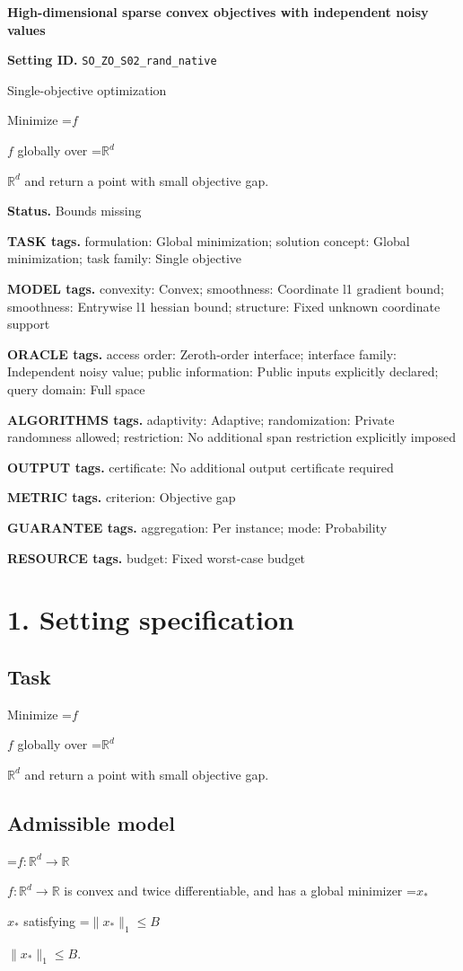 \documentclass[10pt,a4paper]{article}
\newcommand{\AtlasMath}[1]{\par\begingroup\centering\setbox0=\hbox{$\displaystyle #1$}\ifdim\wd0>1.4\linewidth\typeout{ATLAS WIDE FORMULA: \the\wd0}\fi\ifdim\wd0>\linewidth\resizebox{\linewidth}{!}{\box0}\else\box0\fi\par\endgroup}
\newcommand{\AtlasInlineMath}[1]{\begingroup\setbox0=\hbox{$#1$}\ifdim\wd0>.4\linewidth\endgroup\AtlasMath{#1}\else\endgroup$#1$\fi}
\begin{document}
\raggedright

{\LARGE\bfseries\sffamily\color{AtlasNavy} High-dimensional sparse convex objectives with independent noisy values\par}\vspace{5pt}
\textbf{Setting ID.} \texttt{SO\_\allowbreak{}ZO\_\allowbreak{}S02\_\allowbreak{}rand\_\allowbreak{}native}

Single-objective optimization

Minimize \AtlasInlineMath{f} globally over \AtlasInlineMath{\mathbb{R}^d} and return a point with small objective gap.

\textbf{Status.} Bounds missing

\textbf{TASK tags.} formulation: Global minimization; solution concept: Global minimization; task family: Single objective

\textbf{MODEL tags.} convexity: Convex; smoothness: Coordinate l1 gradient bound; smoothness: Entrywise l1 hessian bound; structure: Fixed unknown coordinate support

\textbf{ORACLE tags.} access order: Zeroth-order interface; interface family: Independent noisy value; public information: Public inputs explicitly declared; query domain: Full space

\textbf{ALGORITHMS tags.} adaptivity: Adaptive; randomization: Private randomness allowed; restriction: No additional span restriction explicitly imposed

\textbf{OUTPUT tags.} certificate: No additional output certificate required

\textbf{METRIC tags.} criterion: Objective gap

\textbf{GUARANTEE tags.} aggregation: Per instance; mode: Probability

\textbf{RESOURCE tags.} budget: Fixed worst-case budget

\section{1. Setting specification}
\subsection{Task}
Minimize \AtlasInlineMath{f} globally over \AtlasInlineMath{\mathbb{R}^d} and return a point with small objective gap.

\subsection{Admissible model}
\AtlasInlineMath{f:\mathbb{R}^d\to\mathbb{R}} is convex and twice differentiable, and has a global minimizer \AtlasInlineMath{x_*} satisfying \AtlasInlineMath{\|x_*\|_1\le B}.
\end{document}
